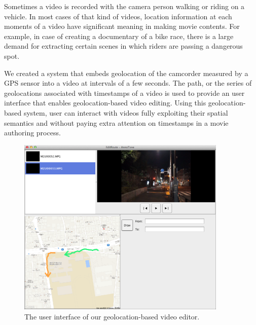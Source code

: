 
Sometimes a video is recorded with the camera person walking or riding on a vehicle.
In most cases of that kind of videos, location information at each moments of a video have significant meaning in making movie contents.
For example, in case of creating a documentary of a bike race, there is a large demand for extracting certain scenes in which riders are passing a dangerous spot.

We created a system that embeds geolocation of the camcorder measured by a GPS sensor into a video at intervals of a few seconds.
The path, or the series of geolocations associated with timestamps of a video is used to provide an user interface that enables geolocation-based video editing.
Using this geolocation-based system, user can interact with videos fully exploiting their spatial semantics and without paying extra attention on timestamps in a movie authoring process.

\begin{figure}[htbp]
 \begin{center}
  \includegraphics[width=100mm]{application_map.png}
 \end{center}
 \caption{The user interface of our geolocation-based video editor.}
 \label{fig:appl_map}
\end{figure}

